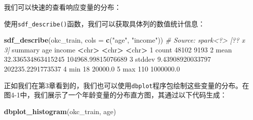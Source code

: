 \documentclass[
]{article}
\newenvironment{Shaded}{\begin{snugshade}}{\end{snugshade}}
\newcommand{\CommentTok}[1]{\textcolor[rgb]{0.56,0.35,0.01}{\textit{#1}}}
\newcommand{\DataTypeTok}[1]{\textcolor[rgb]{0.13,0.29,0.53}{#1}}
\newcommand{\DecValTok}[1]{\textcolor[rgb]{0.00,0.00,0.81}{#1}}
\newcommand{\ErrorTok}[1]{\textcolor[rgb]{0.64,0.00,0.00}{\textbf{#1}}}
\newcommand{\FloatTok}[1]{\textcolor[rgb]{0.00,0.00,0.81}{#1}}
\newcommand{\KeywordTok}[1]{\textcolor[rgb]{0.13,0.29,0.53}{\textbf{#1}}}
\newcommand{\NormalTok}[1]{#1}
\newcommand{\OperatorTok}[1]{\textcolor[rgb]{0.81,0.36,0.00}{\textbf{#1}}}
\newcommand{\StringTok}[1]{\textcolor[rgb]{0.31,0.60,0.02}{#1}}
\begin{document}
我们可以快速的查看响应变量的分布：

\begin{Shaded}
\end{Shaded}

使用\texttt{sdf\_describe()}函数，我们可以获取具体列的数值统计信息：

\begin{Shaded}
\begin{Highlighting}[]
\KeywordTok{sdf_describe}\NormalTok{(okc_train, }\DataTypeTok{cols =} \KeywordTok{c}\NormalTok{(}\StringTok{"age"}\NormalTok{, }\StringTok{"income"}\NormalTok{))}
\CommentTok{# Source: spark<?> [?? x 3]}
\NormalTok{ summary age income}
 \OperatorTok{<}\NormalTok{chr}\OperatorTok{>}\StringTok{ }\ErrorTok{<}\NormalTok{chr}\OperatorTok{>}\StringTok{ }\ErrorTok{<}\NormalTok{chr}\OperatorTok{>}
\DecValTok{1}\NormalTok{ count }\DecValTok{48102} \DecValTok{9193}
\DecValTok{2}\NormalTok{ mean }\FloatTok{32.336534863415245} \FloatTok{104968.99815076689}
\DecValTok{3}\NormalTok{ stddev }\FloatTok{9.43908920033797} \FloatTok{202235.2291773537}
\DecValTok{4}\NormalTok{ min }\DecValTok{18} \FloatTok{20000.0}
\DecValTok{5}\NormalTok{ max }\DecValTok{110} \FloatTok{1000000.0}
\end{Highlighting}
\end{Shaded}

正如我们在第3章看到的，我们也可以使用\texttt{dbplot}程序包绘制这些变量的分布。在图4-1中，我们展示了一个年龄变量的分布直方图，其通过以下代码生成：

\begin{Shaded}
\begin{Highlighting}[]
\KeywordTok{dbplot_histogram}\NormalTok{(okc_train, age)}
\end{Highlighting}
\end{Shaded}
\end{document}
